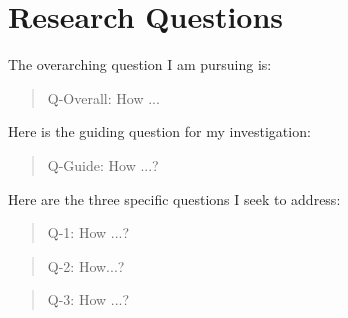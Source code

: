 \section{Research Questions}

The overarching question I am pursuing is:

\begin{quote}
    Q-Overall: How ...
\end{quote}

Here is the guiding question for my investigation:
\begin{quote}
    Q-Guide: How ...?
\end{quote}

Here are the three specific questions I seek to address:

\begin{quote}
    Q-1: How ...?
\end{quote}

\begin{quote}
    Q-2: How...?
\end{quote}

\begin{quote}
    Q-3: How ...?
\end{quote}
